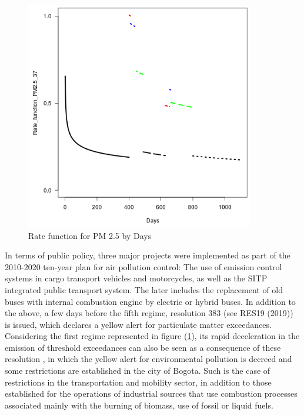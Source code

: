 \documentclass[APA,STIX1COL]{WileyNJD-v2}
\begin{document}
\begin{figure}[h]
\begin{center}
\includegraphics[width=10cm]{funcion de riesgo.png}
\end{center}
\caption{Rate function for PM 2.5 by Days}
\label{fig:fig3}
\end{figure}



In terms of public policy, three major projects were implemented as part of the 2010-2020 ten-year plan for air pollution control: The use of emission control systems in cargo transport vehicles and motorcycles, as well as the SITP integrated public transport system. The later includes the replacement of old buses with internal combustion engine by electric or hybrid buses. In addition to the above, a few days before the fifth regime, resolution 383 (see RES19 (2019)) is issued, which declares a yellow alert for particulate matter exceedances. Considering the first regime represented in figure (\ref{fig:fig3}), its rapid deceleration in the emission of threshold exceedances can also be seen as a consequence of these resolution , in which the yellow alert for environmental pollution is decreed and some restrictions are established in the city of Bogota. Such is the case of restrictions in the transportation and mobility sector, in addition to those established for the operations of industrial sources that use combustion processes associated mainly with the burning of biomass, use of fossil or liquid fuels.
\end{document}
